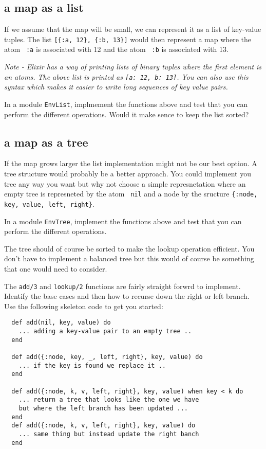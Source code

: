 \documentclass[a4paper,11pt]{article}
\begin{document}
\subsection*{a map as a list}

If we assume that the map will be small, we can represent it as a list
of key-value tuples. The list \verb+[{:a, 12}, {:b, 13}]+ would then
represent a map where the atom \verb+ :a+ is associated with 12 and the
atom \verb+ :b+ is associated with 13.

{\em Note - Elixir has a way of printing lists of binary tuples where
  the first element is an atoms. The above list is printed as
  \verb+[a: 12, b: 13]+. You can also use this syntax which makes it
easier to write long sequences of key value pairs.}

In a module {\tt EnvList}, implmement the functions above and test
that you can perform the different operations. Would it make sence to
keep the list sorted?

\subsection*{a map as a tree}

If the map grows larger the list implementation might not be our best
option. A tree structure would probably be a better approach. You
could implement you tree any way you want but why not choose a simple
represnetation where an empty tree is represneted by the atom {\tt
  nil} and a node by the sructure {\tt \{:node, key, value, left,
  right\}}.

In a module {\tt EnvTree}, implement the functions above and test that
you can perform the different operations.

The tree should of course be sorted to make the lookup operation
efficient. You don't have to implement a balanced tree but this would
of course be something that one would need to consider.

The {\tt add/3} and {\tt lookup/2} functions are fairly straight
forwrd to implement. Identify the base cases and then how to recurse
down the right or left branch. Use the following skeleton code to get
you started:

\begin{verbatim}
  def add(nil, key, value) do
    ... adding a key-value pair to an empty tree ..
  end

  def add({:node, key, _, left, right}, key, value) do 
    ... if the key is found we replace it .. 
  end

  def add({:node, k, v, left, right}, key, value) when key < k do
    ... return a tree that looks like the one we have
    but where the left branch has been updated ...
  end
  def add({:node, k, v, left, right}, key, value) do
    ... same thing but instead update the right banch
  end
\end{verbatim}
\end{document}
